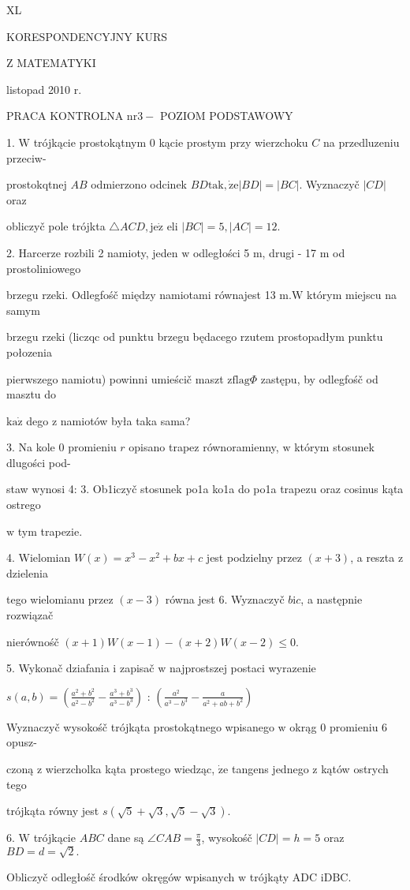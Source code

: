 \documentclass[a4paper,12pt]{article}
\begin{document}
XL

KORESPONDENCYJNY KURS

Z MATEMATYKI

listopad 2010 r.

PRACA KONTROLNA $\mathrm{n}\mathrm{r} 3-$ POZIOM PODSTAWOWY

1. $\mathrm{W}$ trójkącie prostokątnym $0$ kącie prostym przy wierzchoku $C$ na przedluzeniu przeciw-

prostokqtnej $AB$ odmierzono odcinek $BD\mathrm{t}\mathrm{a}\mathrm{k}, \dot{\mathrm{z}}\mathrm{e}|BD|=|BC|$. Wyznaczyč $|CD|$ oraz

obliczyč pole trójkta $\triangle ACD, \mathrm{j}\mathrm{e}\dot{\mathrm{z}}$ eli $|BC|=5, |AC|=12.$

2. Harcerze rozbili 2 namioty, jeden $\mathrm{w}$ odległości 5 $\mathrm{m}$, drugi - 17 $\mathrm{m}$ od prostoliniowego

brzegu rzeki. Odlegfośč między namiotami równajest 13 $\mathrm{m}. \mathrm{W}$ którym miejscu na samym

brzegu rzeki (liczqc od punktu brzegu będacego rzutem prostopadłym punktu połozenia

pierwszego namiotu) powinni umieścič maszt $\mathrm{z}\mathrm{f}\mathrm{l}\mathrm{a}\mathrm{g}\Phi$ zastępu, by odlegfośč od masztu do

$\mathrm{k}\mathrm{a}\dot{\mathrm{z}}$ dego $\mathrm{z}$ namiotów była taka sama?

3. Na kole $0$ promieniu $r$ opisano trapez równoramienny, $\mathrm{w}$ którym stosunek dlugości pod-

staw wynosi 4: 3. Ob1iczyč stosunek po1a ko1a do po1a trapezu oraz cosinus kąta ostrego

$\mathrm{w}$ tym trapezie.

4. Wielomian $W(x) =x^{3}-x^{2}+bx+c$ jest podzielny przez $(x+3)$, a reszta $\mathrm{z}$ dzielenia

tego wielomianu przez $(x-3)$ równa jest 6. Wyznaczyč $b\mathrm{i} c$, a następnie rozwiązač

nierównośč $(x+1)W(x-1)-(x+2)W(x-2)\leq 0.$

5. Wykonač dziafania $\mathrm{i}$ zapisač $\mathrm{w}$ najprostszej postaci wyrazenie

$s(a,b)= (\displaystyle \frac{a^{2}+b^{2}}{a^{2}-b^{2}}-\frac{a^{3}+b^{3}}{a^{3}-b^{3}})$ : $(\displaystyle \frac{a^{2}}{a^{3}-b^{3}}-\frac{a}{a^{2}+ab+b^{2}})$

Wyznaczyč wysokośč trójkąta prostokątnego wpisanego $\mathrm{w}$ okrąg $0$ promieniu 6 opusz-

czoną $\mathrm{z}$ wierzcholka kąta prostego wiedząc, $\dot{\mathrm{z}}\mathrm{e}$ tangens jednego $\mathrm{z}$ kątów ostrych tego

trójkąta równy jest $s(\sqrt{5}+\sqrt{3},\sqrt{5}-\sqrt{3}).$

6. $\mathrm{W}$ trójkącie $ABC$ dane są $\angle CAB= \displaystyle \frac{\pi}{3}$, wysokośč $|CD| =h=5$ oraz $BD=d=\sqrt{2}.$

Obliczyč odległośč środków okręgów wpisanych $\mathrm{w}$ trójkąty ADC $\mathrm{i}\mathrm{D}\mathrm{B}\mathrm{C}.$
\end{document}
